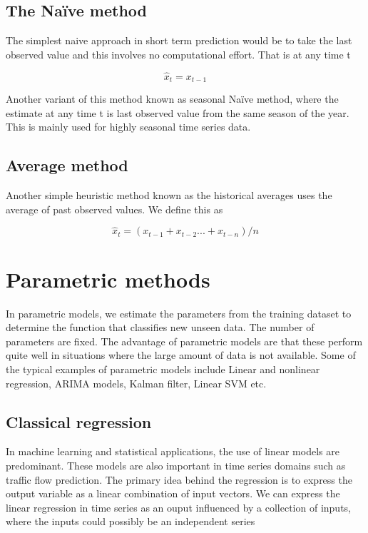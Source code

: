 \subsection{The Naïve method}
The simplest naive approach in short term prediction would be to take the last observed value and
this involves no computational effort. That is at any time t

        \begin{equation}
            \hat{x}_{t} = x_{t-1}
        \end{equation}

Another variant of this method known as seasonal Naïve method, where the estimate at any time t is
last observed value from the same season of the year. This is mainly used for highly seasonal time
series data.

\subsection{Average method}
Another simple heuristic method known as the historical averages uses the average of past observed
values. We define this as

        \begin{equation}
            \hat{x}_{t} = (x_{t-1} + x_{t-2} ... + x_{t-n})/n
        \end{equation}

\section{Parametric methods}
In parametric models, we estimate the parameters from the training dataset to determine the
function that classifies new unseen data. The number of parameters are fixed. The advantage of
parametric models are that these perform quite well in situations where the large amount of data
is not available. Some of the typical examples of parametric models include Linear and
nonlinear regression, ARIMA models, Kalman filter, Linear SVM etc.

\subsection{Classical regression}
In machine learning and statistical applications, the use of linear models are predominant. These
models are also important in time series domains such as traffic flow prediction. The primary
idea behind the regression is to express the output variable as a linear combination of input
vectors. We can express the linear regression in time series as an ouput influenced by a
collection of inputs, where the inputs could possibly be an independent series

